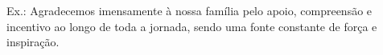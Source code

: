 Ex.: Agradecemos imensamente à nossa família pelo apoio, compreensão e incentivo ao longo de toda a jornada, sendo uma fonte constante de força e inspiração.